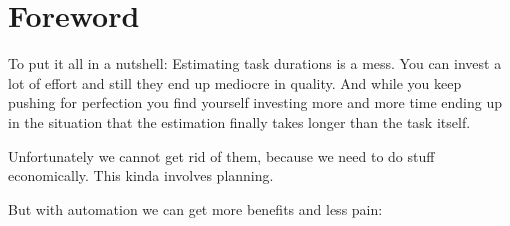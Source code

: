 \hypertarget{foreword}{%
\section{Foreword}\label{foreword}}

To put it all in a nutshell: Estimating task durations is a mess. You can invest a lot of effort and still they end up mediocre in quality.
And while you keep pushing for perfection you find yourself investing more and more time ending up in the situation that the estimation finally takes longer than the task itself.

Unfortunately we cannot get rid of them, because we need to do stuff economically. This kinda involves planning.

But with automation we can get more benefits and less pain:

